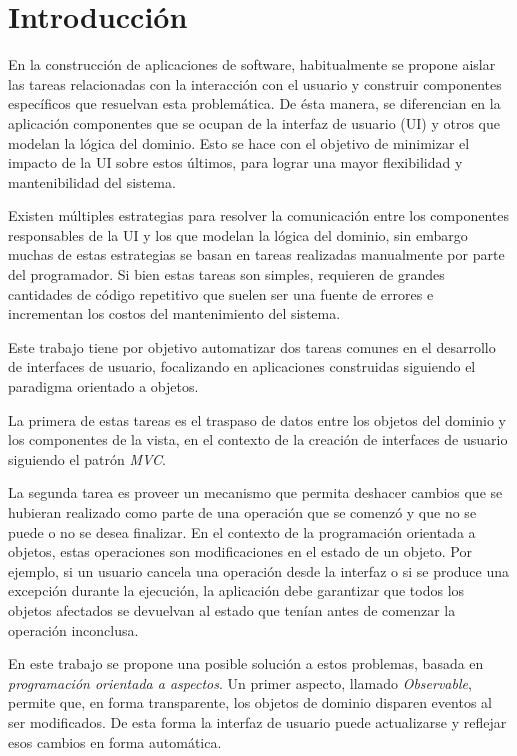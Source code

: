 \section{Introducción}

En la construcción de aplicaciones de software, habitualmente se propone
aislar las tareas relacionadas con la interacción con el usuario y construir
componentes específicos que resuelvan esta problemática. 
De ésta manera, se diferencian en la aplicación componentes que se ocupan de la
interfaz de usuario (UI) y otros que modelan la lógica del dominio. 
Esto se hace con el objetivo de minimizar el impacto de la UI sobre estos
últimos, para lograr una mayor flexibilidad y mantenibilidad del sistema.

Existen múltiples estrategias para resolver la comunicación entre los componentes
responsables de la UI y los que modelan la lógica del dominio, sin embargo
muchas de estas estrategias se basan en tareas realizadas manualmente por
parte del programador. Si bien estas tareas son simples, requieren de grandes
cantidades de código repetitivo que suelen ser una fuente de errores e
incrementan los costos del mantenimiento del sistema.

\medskip

Este trabajo tiene por objetivo automatizar dos tareas comunes en el
desarrollo de interfaces de usuario, focalizando en aplicaciones construidas
siguiendo el paradigma orientado a objetos.

La primera de estas tareas es el traspaso de datos entre los objetos del dominio
y los componentes de la vista, en el contexto de la creación de interfaces de
usuario siguiendo el patrón \emph{MVC}.
 
La segunda tarea es proveer un mecanismo que permita deshacer cambios que se
hubieran realizado como parte de una operación que se comenzó y que no se puede
o no se desea finalizar.
En el contexto de la programación orientada a objetos, estas operaciones son
modificaciones en el estado de un objeto.
Por ejemplo, si un usuario cancela una operación desde
la interfaz o si se produce una excepción durante la ejecución, la aplicación
debe garantizar que todos los objetos afectados se devuelvan al estado que
tenían antes de comenzar la operación inconclusa.

\medskip 

En este trabajo se propone una posible solución a estos problemas, basada en
\emph{programación orientada a aspectos}.
Un primer aspecto, llamado \emph{Observable}, permite que, en forma
transparente, los objetos de dominio disparen eventos al ser modificados.
De esta forma la interfaz de usuario puede actualizarse y reflejar esos
cambios en forma automática.


